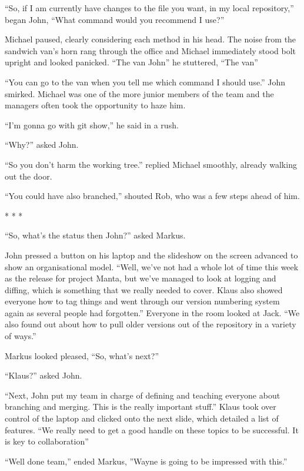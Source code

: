 \begin{trenches}
``So, if I am currently have changes to the file you want, in my local repository,'' began John, ``What command would you recommend I use?''

Michael paused, clearly considering each method in his head.  The noise from the sandwich van's horn rang through the office and Michael immediately stood bolt upright and looked panicked.  ``The van John'' he stuttered, ``The van''

``You can go to the van when you tell me which command I should use.''  John smirked.  Michael was one of the more junior members of the team and the managers often took the opportunity to haze him.

``I'm gonna go with git show,'' he said in a rush.

``Why?'' asked John.

``So you don't harm the working tree.'' replied Michael smoothly, already walking out the door.

``You could have also branched,'' shouted Rob, who was a few steps ahead of him.

\begin{center}* * *\end{center}

``So, what's the status then John?'' asked Markus.

John pressed a button on his laptop and the slideshow on the screen advanced to show an organisational model.  ``Well, we've not had a whole lot of time this week as the release for project Manta, but we've managed to look at logging and diffing, which is something that we really needed to cover.  Klaus also showed everyone how to tag things and went through our version numbering system again as several people had forgotten.''  Everyone in the room looked at Jack.  ``We also found out about how to pull older versions out of the repository in a variety of ways.''

Markus looked pleased, ``So, what's next?''

``Klaus?'' asked John.

``Next, John put my team in charge of defining and teaching everyone about branching and merging.  This is the really important stuff.''  Klaus took over control of the laptop and clicked onto the next slide, which detailed a list of features.  ``We really need to get a good handle on these topics to be successful.  It is key to collaboration''

``Well done team,'' ended Markus, ''Wayne is going to be impressed with this.''

\end{trenches}

